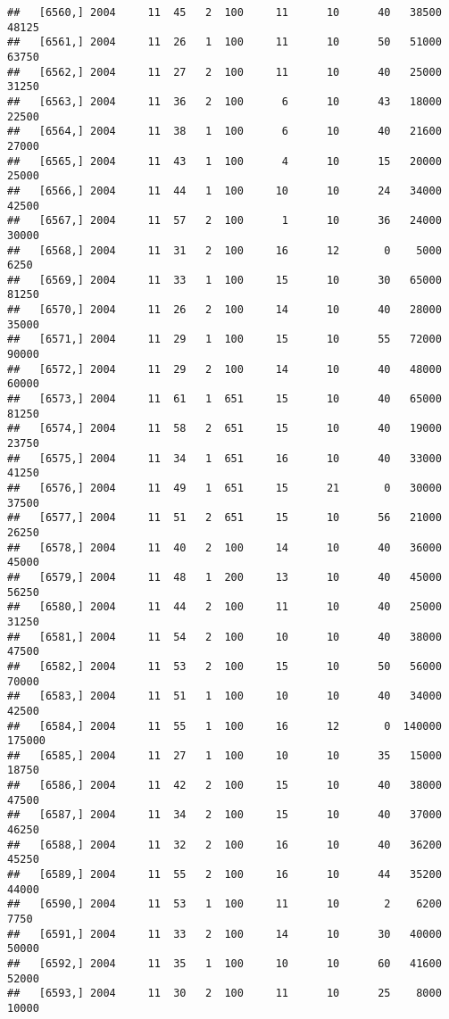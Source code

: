 \documentclass{article}\usepackage[]{graphicx}\usepackage[]{color}
\makeatletter
\newenvironment{kframe}{%
 \def\at@end@of@kframe{}%
 \ifinner\ifhmode%
  \def\at@end@of@kframe{\end{minipage}}%
  \begin{minipage}{\columnwidth}%
 \fi\fi%
 \def\FrameCommand##1{\hskip\@totalleftmargin \hskip-\fboxsep
 \colorbox{shadecolor}{##1}\hskip-\fboxsep
     \hskip-\linewidth \hskip-\@totalleftmargin \hskip\columnwidth}%
 \MakeFramed {\advance\hsize-\width
   \@totalleftmargin\z@ \linewidth\hsize
   \@setminipage}}%
 {\par\unskip\endMakeFramed%
 \at@end@of@kframe}
\newenvironment{knitrout}{}{} %
\makeatother
\begin{document}
\begin{knitrout}
\begin{kframe}
\begin{verbatim}
##   [6560,] 2004     11  45   2  100     11      10      40   38500   48125
##   [6561,] 2004     11  26   1  100     11      10      50   51000   63750
##   [6562,] 2004     11  27   2  100     11      10      40   25000   31250
##   [6563,] 2004     11  36   2  100      6      10      43   18000   22500
##   [6564,] 2004     11  38   1  100      6      10      40   21600   27000
##   [6565,] 2004     11  43   1  100      4      10      15   20000   25000
##   [6566,] 2004     11  44   1  100     10      10      24   34000   42500
##   [6567,] 2004     11  57   2  100      1      10      36   24000   30000
##   [6568,] 2004     11  31   2  100     16      12       0    5000    6250
##   [6569,] 2004     11  33   1  100     15      10      30   65000   81250
##   [6570,] 2004     11  26   2  100     14      10      40   28000   35000
##   [6571,] 2004     11  29   1  100     15      10      55   72000   90000
##   [6572,] 2004     11  29   2  100     14      10      40   48000   60000
##   [6573,] 2004     11  61   1  651     15      10      40   65000   81250
##   [6574,] 2004     11  58   2  651     15      10      40   19000   23750
##   [6575,] 2004     11  34   1  651     16      10      40   33000   41250
##   [6576,] 2004     11  49   1  651     15      21       0   30000   37500
##   [6577,] 2004     11  51   2  651     15      10      56   21000   26250
##   [6578,] 2004     11  40   2  100     14      10      40   36000   45000
##   [6579,] 2004     11  48   1  200     13      10      40   45000   56250
##   [6580,] 2004     11  44   2  100     11      10      40   25000   31250
##   [6581,] 2004     11  54   2  100     10      10      40   38000   47500
##   [6582,] 2004     11  53   2  100     15      10      50   56000   70000
##   [6583,] 2004     11  51   1  100     10      10      40   34000   42500
##   [6584,] 2004     11  55   1  100     16      12       0  140000  175000
##   [6585,] 2004     11  27   1  100     10      10      35   15000   18750
##   [6586,] 2004     11  42   2  100     15      10      40   38000   47500
##   [6587,] 2004     11  34   2  100     15      10      40   37000   46250
##   [6588,] 2004     11  32   2  100     16      10      40   36200   45250
##   [6589,] 2004     11  55   2  100     16      10      44   35200   44000
##   [6590,] 2004     11  53   1  100     11      10       2    6200    7750
##   [6591,] 2004     11  33   2  100     14      10      30   40000   50000
##   [6592,] 2004     11  35   1  100     10      10      60   41600   52000
##   [6593,] 2004     11  30   2  100     11      10      25    8000   10000

\end{verbatim}
\end{kframe}
\end{knitrout}
\end{document}
